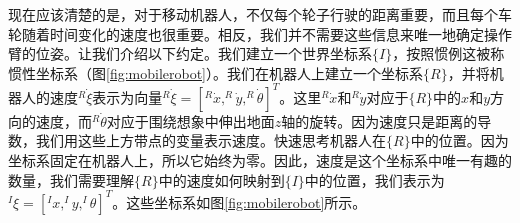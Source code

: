 
现在应该清楚的是，对于移动机器人，不仅每个轮子行驶的距离重要，而且每个车轮随着时间变化的速度也很重要。相反，我们并不需要这些信息来唯一地确定操作臂的位姿。让我们介绍以下约定。我们建立一个世界坐标系$\{I\}$，按照惯例这被称惯性坐标系（图\ref{fig:mobilerobot}）。我们在机器人上建立一个坐标系$\{R\}$，并将机器人的速度$^R\dot{\xi}$表示为向量$^R\dot{\xi}=[^R\dot{x},^R\dot{y},^R\dot{\theta}]^T$。这里$^R\dot{x}$和$^R\dot{y}$对应于$\{R\}$中的$x$和$y$方向的速度，而$^R\dot{\theta}$对应于围绕想象中伸出地面$z$轴的旋转。因为速度只是距离的导数，我们用这些上方带点的变量表示速度。快速思考机器人在$\{R\}$中的位置。因为坐标系固定在机器人上，所以它始终为零。因此，速度是这个坐标系中唯一有趣的数量，我们需要理解$\{R\}$中的速度如何映射到$\{I\}$中的位置，我们表示为$^I\xi=[^Ix,^Iy,^I\theta]^T$。这些坐标系如图\ref{fig:mobilerobot}所示。

